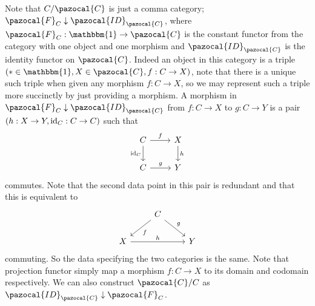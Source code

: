 \begin{remark}
    Note that $C/\pazocal{C}$ is just a comma category; $\pazocal{F}_C\downarrow \pazocal{ID}_\pazocal{C}$, where $\pazocal{F}_C: \mathbbm{1} \rightarrow \pazocal{C}$ is the constant functor from the category with one object and one morphism and $\pazocal{ID}_\pazocal{C}$ is the identity functor on $\pazocal{C}$. Indeed an object in this category is a triple $(\ast\in \mathbbm{1},X\in \pazocal{C},f: C\rightarrow X)$, note that there is a unique such triple when given any morphism $f: C\rightarrow X$, so we may represent such a triple more succinctly by just providing a morphism. A morphism in $\pazocal{F}_C\downarrow \pazocal{ID}_\pazocal{C}$ from $f:C\rightarrow X$ to $g: C\rightarrow Y$ is a pair $(h:X\rightarrow Y, \mathrm{id}_C: C\rightarrow C)$ such that 
    $$
        \begin{tikzcd}
            C \arrow[r, "f"]\arrow[d,"\id_C",swap] & X\arrow[d, "h"]\\
            C \arrow[r, "g"] & Y  
        \end{tikzcd}
    $$
    commutes. Note that the second data point in this pair is redundant and that this is equivalent to 
    $$
        \begin{tikzcd}
            & C\arrow[ld, "f"]\arrow[rd, "g"]\\
            X \arrow{rr}{h} & & Y 
        \end{tikzcd}
    $$
    commuting. So the data specifying the two categories is the same. Note that projection functor simply map a morphism $f: C \rightarrow X$ to its domain and codomain respectively. We can also construct $\pazocal{C}/C$ as $\pazocal{ID}_\pazocal{C}\downarrow \pazocal{F}_C$.  
\end{remark} 

